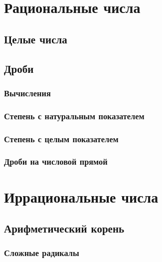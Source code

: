 \documentclass[10pt, a4paper]{article}
\begin{document}
\section{Рациональные числа}
	\subsection{Целые числа}
	\subsection{Дроби}
		\subsubsection{Вычисления}
		\subsubsection{Степень с натуральным показателем}
		\subsubsection{Степень с целым показателем}
		\subsubsection{Дроби на числовой прямой}
\section{Иррациональные числа}
	\subsection{Арифметический корень}
		\subsubsection{Сложные радикалы}
\end{document}

